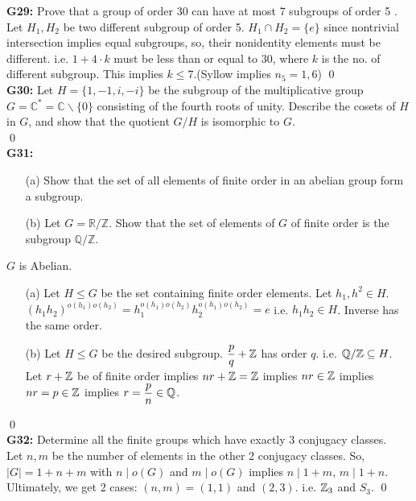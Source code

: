 \textbf{G29:} Prove that a group of order 30 can have at most 7 subgroups of order 5 .
\soln
Let $ H_1,H_2 $ be two different subgroup of order 5. $ H_1\cap H_2 = \{e\}$ since nontrivial intersection implies equal subgroups, so, their nonidentity elements must be different. i.e. $ 1+4\cdot k $ must be less than or equal to $ 30 $, where $ k $ is the no. of different subgroup. This implies $ k\le 7 $.(Syllow implies $ n_5=1,6 $)
\qed\\

\textbf{G30:} Let $H=\{1,-1, i,-i\}$ be the subgroup of the multiplicative group $G=\mathbb{C}^{*}=\mathbb{C} \backslash\{0\}$ consisting of the fourth roots of unity. Describe the cosets of $H$ in $G$, and show that the quotient $G / H$ is isomorphic to $G$.\\
\soln
\qed\\

\textbf{G31:} 
\begin{itemize}
	\item[(a)] Show that the set of all elements of finite order in an abelian group form a subgroup.
	\item[(b)] Let $G=\mathbb{R} / \mathbb{Z}$. Show that the set of elements of $G$ of finite order is the subgroup $\mathbb{Q} / \mathbb{Z}$.
\end{itemize}
\soln $ G  $ is Abelian.\\

\begin{itemize}
	\item[(a)] Let $ H\le G $ be the set containing finite order elements. Let $ h_1,h^2\in H $. $ (h_1h_2)^{o(h_1)o(h_2)}=h_1^{o(h_1)o(h_2)}h_2^{o(h_1)o(h_2)}=e $ i.e. $ h_1h_2 \in H$. Inverse has the same order.
	\item[(b)] Let $ H\le G $ be the desired subgroup. $ \dfrac{p}{q} + \mathbb{Z} $ has order $ q $. i.e. $ \mathbb{Q}/\mathbb{Z}\subseteq H $.\\
	Let $ r+ \mathbb{Z} $ be of finite order implies $ nr + \mathbb{Z} =\mathbb{Z} $ implies $ nr\in \mathbb{Z} $ implies $ nr = p\in \mathbb{Z} $ implies $ r= \dfrac{p}{n} \in \mathbb{Q}$.
\end{itemize}
\qed\\

\textbf{G32:} Determine all the finite groups which have exactly 3 conjugacy classes.\\
\soln
Let $ n,m $ be the number of elements in the other 2 conjugacy classes. So, $ \mid G \mid = 1+n+m $ with $ n\mid o(G) $ and $ m\mid o(G) $ implies $ n\mid 1+m $, $ m\mid 1+n $. Ultimately, we get 2 cases: $ (n,m)=(1,1) $ and $ (2,3) $. i.e. $ \mathbb{Z}_3 $ and $ S_3 $.
\qed\\ 

